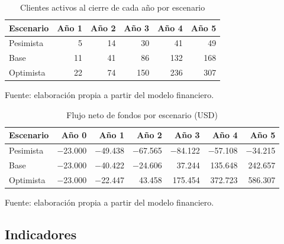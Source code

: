 \begin{table}[h]
\centering
\caption{Clientes activos al cierre de cada año por escenario}
\label{tab:clientes-fin}
\begin{tabular}{lrrrrr}
\hline
\textbf{Escenario} & \textbf{Año 1} & \textbf{Año 2} & \textbf{Año 3} & \textbf{Año 4} & \textbf{Año 5} \\
\hline
Pesimista & 5 & 14 & 30 & 41 & 49 \\
Base & 11 & 41 & 86 & 132 & 168 \\
Optimista & 22 & 74 & 150 & 236 & 307 \\
\hline
\end{tabular}\par
{\small Fuente: elaboración propia a partir del modelo financiero.\par}
\end{table}
\FloatBarrier

\begin{table}[h]
\centering
\caption{Flujo neto de fondos por escenario (USD)}
\label{tab:flujos-fin}
\begin{tabular}{lrrrrrr}
\hline
\textbf{Escenario} & \textbf{Año 0} & \textbf{Año 1} & \textbf{Año 2} & \textbf{Año 3} & \textbf{Año 4} & \textbf{Año 5} \\
\hline
Pesimista & $-$23.000 & $-$49.438 & $-$67.565 & $-$84.122 & $-$57.108 & $-$34.215 \\
Base & $-$23.000 & $-$40.422 & $-$24.606 & 37.244 & 135.648 & 242.657 \\
Optimista & $-$23.000 & $-$22.447 & 43.458 & 175.454 & 372.723 & 586.307 \\
\hline
\end{tabular}\par
{\small Fuente: elaboración propia a partir del modelo financiero.\par}
\end{table}
\FloatBarrier

\subsection{Indicadores}


